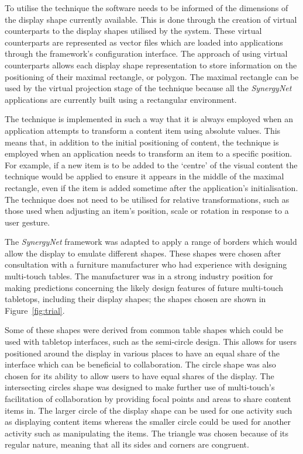 \documentclass{bmcart}
\begin{document}
To utilise the technique the software needs to be informed of the dimensions of the display shape currently available.
This is done through the creation of virtual counterparts to the display shapes utilised by the system.
These virtual counterparts are represented as vector files which are loaded into applications through the framework's configuration interface.
The approach of using virtual counterparts allows each display shape representation to store information on the positioning of their maximal rectangle, or polygon.
The maximal rectangle can be used by the virtual projection stage of the technique because all the {\emph{SynergyNet}} applications are currently built using a rectangular environment.

The technique is implemented in such a way that it is always employed when an application attempts to transform a content item using absolute values.
This means that, in addition to the initial positioning of content, the technique is employed when an application needs to transform an item to a specific position.
For example, if a new item is to be added to the `centre' of the visual content the technique would be applied to ensure it appears in the middle of the maximal rectangle, even if the item is added sometime after the application's initialisation.
The technique does not need to be utilised for relative transformations, such as those used when adjusting an item's position, scale or rotation in response to a user gesture.


The {\emph{SynergyNet}} framework was adapted to apply a range of borders which would allow the display to emulate different shapes.
These shapes were chosen after consultation with a furniture manufacturer who had experience with designing multi-touch tables.
The manufacturer was in a strong industry position for making predictions concerning the likely design features of future multi-touch tabletops, including their display shapes; the shapes chosen are shown in Figure~\ref{fig:trial}.

Some of these shapes were derived from common table shapes which could be used with tabletop interfaces, such as the semi-circle design.
This allows for users positioned around the display in various places to have an equal share of the interface which can be beneficial to collaboration.
The circle shape was also chosen for its ability to allow users to have equal shares of the display.
The intersecting circles shape was designed to make further use of multi-touch's facilitation of collaboration by providing focal points and areas to share content items in.
The larger circle of the display shape can be used for one activity such as displaying content items whereas the smaller circle could be used for another activity such as manipulating the items.
The triangle was chosen because of its regular nature, meaning that all its sides and corners are congruent.
\end{document}

